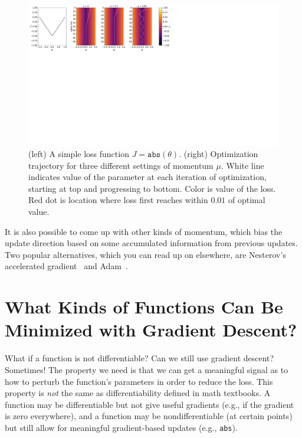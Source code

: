 \begin{figure}[h]
    \centering
    \includegraphics[width=1.0\linewidth]{./figures/gradient_descent/momentum_out1.pdf}
    \caption{(left) A simple loss function $J = \texttt{abs}(\theta)$. (right) Optimization trajectory for three different settings of momentum $\mu$. White line indicates value of the parameter at each iteration of optimization, starting at top and progressing to bottom. Color is value of the loss. Red dot is location where loss first reaches within $0.01$ of optimal value.}
    \label{fig-gradient_descent-momentum_out1}
\end{figure}

It is also possible to come up with other kinds of momentum, which bias the update direction based on some accumulated information from previous updates. Two popular alternatives, which you can read up on elsewhere, are Nesterov's accelerated gradient~\cite{nesterov1983method} and Adam~\cite{kingma2014adam}.


\section{What Kinds of Functions Can Be Minimized with Gradient Descent?}

What if a function is not differentiable? Can we still use gradient descent? Sometimes! The property we need is that we can get a meaningful signal as to how to perturb the function's parameters in order to reduce the loss. This property is \textit{not} the same as differentiability defined in math textbooks. A function may be differentiable but not give useful gradients (e.g., if the gradient is zero everywhere), and a function may be nondifferentiable (at certain points) but still allow for meaningful gradient-based updates (e.g., \texttt{abs}).

